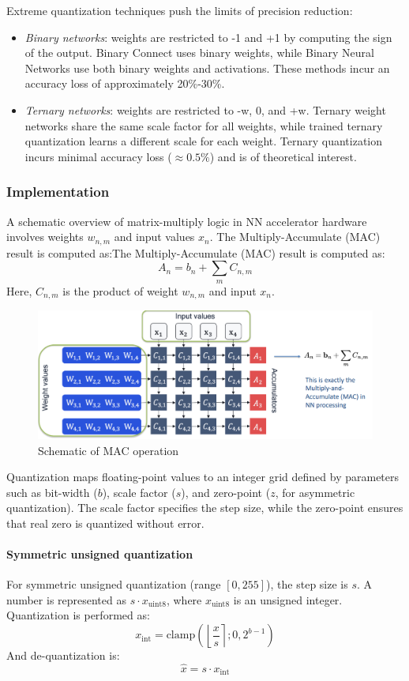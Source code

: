 Extreme quantization techniques push the limits of precision reduction:
\begin{itemize}
    \item \textit{Binary networks}: weights are restricted to -1 and +1 by computing the sign of the output. 
        Binary Connect uses binary weights, while Binary Neural Networks use both binary weights and activations. 
        These methods incur an accuracy loss of approximately 20\%-30\%.
    \item \textit{Ternary networks}: weights are restricted to -w, 0, and +w. 
        Ternary weight networks share the same scale factor for all weights, while trained ternary quantization learns a different scale for each weight. 
        Ternary quantization incurs minimal accuracy loss ($\approx0.5\%$) and is of theoretical interest.
\end{itemize}

\subsubsection{Implementation}
A schematic overview of matrix-multiply logic in NN accelerator hardware involves weights $w_{n,m}$ and input values $x_n$.
The Multiply-Accumulate (MAC) result is computed as:The Multiply-Accumulate (MAC) result is computed as:
\[A_n=b_n+\sum_mC_{n,m}\] 
Here, $C_{n,m}$ is the product of weight $w_{n,m}$ and input $x_n$. 
\begin{figure}[H]
    \centering
    \includegraphics[width=0.75\linewidth]{images/eeai9.png}
    \caption{Schematic of MAC operation}
\end{figure}
Quantization maps floating-point values to an integer grid defined by parameters such as bit-width ($b$), scale factor ($s$), and zero-point ($z$, for asymmetric quantization).
The scale factor specifies the step size, while the zero-point ensures that real zero is quantized without error.

\paragraph*{Symmetric unsigned quantization}
For symmetric unsigned quantization (range $[0,255]$), the step size is $s$. 
A number is represented as $s\cdot x_{\text{uint8}}$, where $x_{\text{uint8}}$ is an unsigned integer. 
Quantization is performed as:
\[x_{\text{int}}=\text{clamp}\left(\left\lfloor \dfrac{x}{s}\right\rceil;0,2^{b-1} \right)\]
\noindent And de-quantization is:
\[\hat{x}=s\cdot x_{\text{int}}\]

